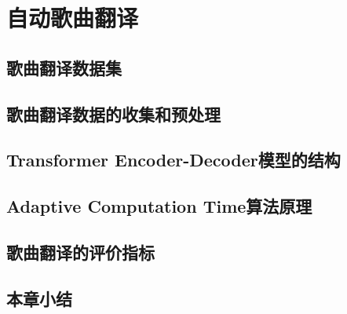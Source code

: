 \chapter{自动歌曲翻译}
\section{歌曲翻译数据集}
\section{歌曲翻译数据的收集和预处理}
\section{Transformer Encoder-Decoder模型的结构}
\section{Adaptive Computation Time算法原理}
\section{歌曲翻译的评价指标}
\section{本章小结}
